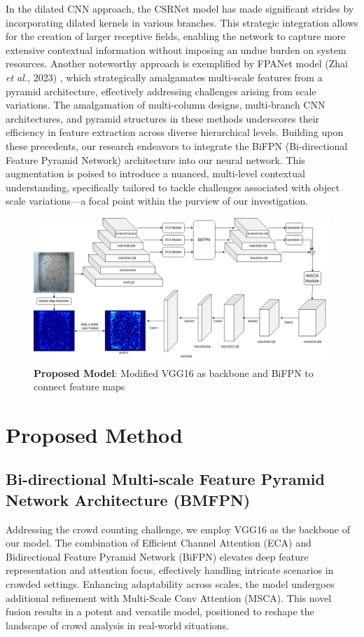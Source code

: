 \documentclass[journal]{IEEEtran}
\begin{document}
In the dilated CNN approach, the CSRNet \cite{csrnet} model has made significant strides by incorporating dilated kernels in various branches. This strategic integration allows for the creation of larger receptive fields, enabling the network to capture more extensive contextual information without imposing an undue burden on system resources.
Another noteworthy approach is exemplified by FPANet model (Zhai \textit{et al.}, 2023) \cite{fpanet}, which strategically amalgamates multi-scale features from a pyramid architecture, effectively addressing challenges arising from scale variations.
The amalgamation of multi-column designs, multi-branch CNN architectures, and pyramid structures in these methods underscores their efficiency in feature extraction across diverse hierarchical levels. Building upon these precedents, our research endeavors to integrate the BiFPN (Bi-directional Feature Pyramid Network) \cite{bifpn} architecture into our neural network. This augmentation is poised to introduce a nuanced, multi-level contextual understanding, specifically tailored to tackle challenges associated with object scale variations—a focal point within the purview of our investigation.
\begin{figure}[t]
        \centering
        \includegraphics[width=\linewidth]{Fig/model diagram v2.png}
        \caption{\textbf{Proposed Model}: Modified VGG16\cite{vgg16} as backbone and BiFPN\cite{bifpn} to connect feature maps}
        \label{fig:2}
\end{figure}
\section{Proposed Method}
\subsection{Bi-directional Multi-scale Feature Pyramid Network Architecture (BMFPN)}
Addressing the crowd counting challenge, we employ VGG16 as the backbone of our model. The combination of Efficient Channel Attention (ECA) and Bidirectional Feature Pyramid Network (BiFPN) elevates deep feature representation and attention focus, effectively handling intricate scenarios in crowded settings. Enhancing adaptability across scales, the model undergoes additional refinement with Multi-Scale Conv Attention (MSCA). This novel fusion results in a potent and versatile model, positioned to reshape the landscape of crowd analysis in real-world situations.
\end{document}
